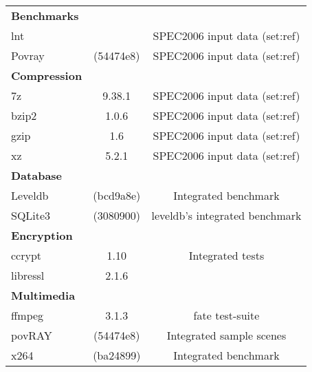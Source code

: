 \begin{longtable}{lcC} \toprule
         &  & \\
    \toprule
    \textbf{Benchmarks}\\
    lnt                      &    & SPEC2006 input data (set:ref)\\
    Povray                   & (54474e8)               & SPEC2006 input data (set:ref)\\
    \midrule
    \textbf{Compression}\\
    7z                       & 9.38.1                  & SPEC2006 input data (set:ref)\\
    bzip2                    & 1.0.6                   & SPEC2006 input data (set:ref)\\
    gzip                     & 1.6                     & SPEC2006 input data (set:ref)\\
    xz                       & 5.2.1                   & SPEC2006 input data (set:ref)\\
    \midrule
    \textbf{Database}\\
    Leveldb                  & (bcd9a8e)               & Integrated benchmark\\
    SQLite3                  & (3080900)               & leveldb's integrated benchmark\\
    \midrule
    \textbf{Encryption}\\
    ccrypt                   & 1.10                    & Integrated tests\\
    libressl                 & 2.1.6\\
    \midrule
    \textbf{Multimedia}\\
    ffmpeg                   & 3.1.3                   & fate test-suite\\
    povRAY                   & (54474e8)               & Integrated sample scenes\\
    x264                     & (ba24899)               & Integrated benchmark\\

\end{longtable}
